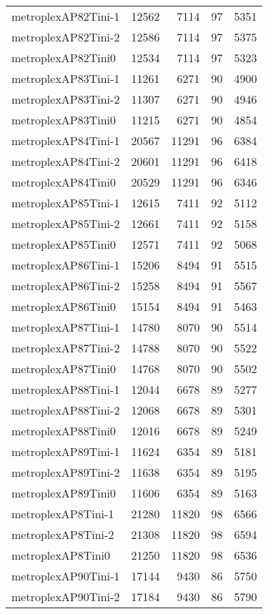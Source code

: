 \begin{longtable}{lrrrr}
metroplexAP82Tini-1 & 12562 & 7114 & 97 & 5351 \\
metroplexAP82Tini-2 & 12586 & 7114 & 97 & 5375 \\
metroplexAP82Tini0 & 12534 & 7114 & 97 & 5323 \\
metroplexAP83Tini-1 & 11261 & 6271 & 90 & 4900 \\
metroplexAP83Tini-2 & 11307 & 6271 & 90 & 4946 \\
metroplexAP83Tini0 & 11215 & 6271 & 90 & 4854 \\
metroplexAP84Tini-1 & 20567 & 11291 & 96 & 6384 \\
metroplexAP84Tini-2 & 20601 & 11291 & 96 & 6418 \\
metroplexAP84Tini0 & 20529 & 11291 & 96 & 6346 \\
metroplexAP85Tini-1 & 12615 & 7411 & 92 & 5112 \\
metroplexAP85Tini-2 & 12661 & 7411 & 92 & 5158 \\
metroplexAP85Tini0 & 12571 & 7411 & 92 & 5068 \\
metroplexAP86Tini-1 & 15206 & 8494 & 91 & 5515 \\
metroplexAP86Tini-2 & 15258 & 8494 & 91 & 5567 \\
metroplexAP86Tini0 & 15154 & 8494 & 91 & 5463 \\
metroplexAP87Tini-1 & 14780 & 8070 & 90 & 5514 \\
metroplexAP87Tini-2 & 14788 & 8070 & 90 & 5522 \\
metroplexAP87Tini0 & 14768 & 8070 & 90 & 5502 \\
metroplexAP88Tini-1 & 12044 & 6678 & 89 & 5277 \\
metroplexAP88Tini-2 & 12068 & 6678 & 89 & 5301 \\
metroplexAP88Tini0 & 12016 & 6678 & 89 & 5249 \\
metroplexAP89Tini-1 & 11624 & 6354 & 89 & 5181 \\
metroplexAP89Tini-2 & 11638 & 6354 & 89 & 5195 \\
metroplexAP89Tini0 & 11606 & 6354 & 89 & 5163 \\
metroplexAP8Tini-1 & 21280 & 11820 & 98 & 6566 \\
metroplexAP8Tini-2 & 21308 & 11820 & 98 & 6594 \\
metroplexAP8Tini0 & 21250 & 11820 & 98 & 6536 \\
metroplexAP90Tini-1 & 17144 & 9430 & 86 & 5750 \\
metroplexAP90Tini-2 & 17184 & 9430 & 86 & 5790 \\

\end{longtable}
